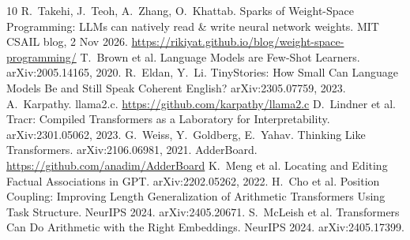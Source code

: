 \documentclass[11pt]{article}
\begin{document}
\begin{thebibliography}{10}
 R.~Takehi, J.~Teoh, A.~Zhang, O.~Khattab. Sparks of Weight-Space Programming: LLMs can natively read \& write neural network weights. MIT CSAIL blog, 2 Nov 2026. \url{https://rikiyat.github.io/blog/weight-space-programming/}
 T.~Brown et al. Language Models are Few-Shot Learners. arXiv:2005.14165, 2020.
 R.~Eldan, Y.~Li. TinyStories: How Small Can Language Models Be and Still Speak Coherent English? arXiv:2305.07759, 2023.
 A.~Karpathy. llama2.c. \url{https://github.com/karpathy/llama2.c}
 D.~Lindner et al. Tracr: Compiled Transformers as a Laboratory for Interpretability. arXiv:2301.05062, 2023.
 G.~Weiss, Y.~Goldberg, E.~Yahav. Thinking Like Transformers. arXiv:2106.06981, 2021.
 AdderBoard. \url{https://github.com/anadim/AdderBoard}
 K.~Meng et al. Locating and Editing Factual Associations in GPT. arXiv:2202.05262, 2022.
 H.~Cho et al. Position Coupling: Improving Length Generalization of Arithmetic Transformers Using Task Structure. NeurIPS 2024. arXiv:2405.20671.
 S.~McLeish et al. Transformers Can Do Arithmetic with the Right Embeddings. NeurIPS 2024. arXiv:2405.17399.
\end{thebibliography}
\end{document}
